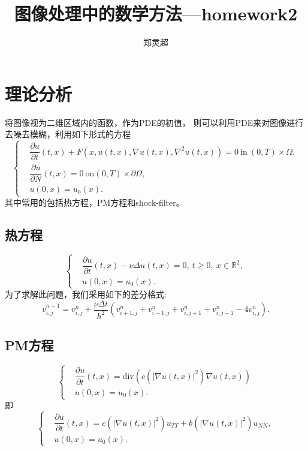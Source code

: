 \documentclass[a4paper,  11pt]{ctexart}
\newcommand\bbR{\mathbb{R}}
\newcommand\pd[2]{\dfrac{\partial {#1}}{\partial {#2}}}
\begin{document}
\title{图像处理中的数学方法—homework2}
\author{郑灵超}
\maketitle

\section{理论分析}
将图像视为二维区域内的函数，作为PDE的初值，
则可以利用PDE来对图像进行去噪去模糊，利用如下形式的方程
\begin{equation*} 
	\left\{
	\begin{aligned}
		&\pd{u}{t}(t,x)+F(x,u(t,x),\nabla u(t,x),\nabla^2 u(t,x))
		=0\ \text{in}\ (0,T)\times \Omega, \\
		&\pd{u}{N}(t,x)=0 \ \text{on} (0,T)\times \partial\Omega, \\
		& u(0,x)=u_0(x).
	\end{aligned}
	\right.
\end{equation*}
其中常用的包括热方程，PM方程和shock-filter。
\subsection{热方程}
\begin{equation*}
	\left\{
	\begin{aligned}
	&\pd{u}{t}(t,x)-\nu\Delta u(t,x)=0, \ t \geq 0,\ x\in\bbR^2, \\
    &u(0,x)=u_0(x).
\end{aligned}
	\right.
\end{equation*}
为了求解此问题，我们采用如下的差分格式:
\[
v_{i,j}^{n+1}=v_{i,j}^n+\frac{\nu\Delta t}{h^2}
(v_{i+1,j}^n+v_{i-1,j}^n+v_{i,j+1}^n+v_{i,j-1}^n-4v_{i,j}^n).
\]
\subsection{PM方程}
\begin{equation*}
	\left\{
	\begin{aligned}
		&\pd{u}{t}(t,x)=\text{div}
		(c(|\nabla u(t,x)|^2)\nabla u(t,x)) \\
    &u(0,x)=u_0(x).
\end{aligned}
	\right.
\end{equation*}
即
\begin{equation*}
	\left\{
	\begin{aligned}
		&\pd{u}{t}(t,x)= c(|\nabla u(t,x)|^2)u_{TT}
		+b(|\nabla u(t,x)|^2)u_{NN}, \\
	&u(0,x)=u_0(x).
\end{aligned}
	\right.
\end{equation*}
\end{document}
